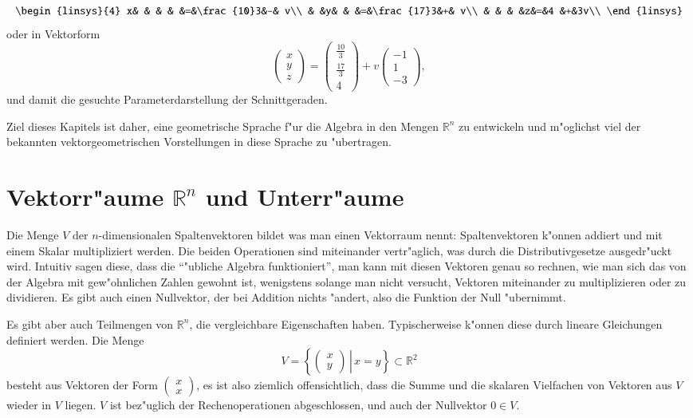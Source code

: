 \begin{equation}
\begin{linsys}{4}
x& & & & &=&\frac{10}3&-& v\\
 & &y& & &=&\frac{17}3&+& v\\
 & & & &z&=&4         &+&3v\\
\end{linsys}
\end{equation}
oder in Vektorform
\begin{equation}
\begin{pmatrix}x\\y\\z\end{pmatrix}
=\begin{pmatrix}\frac{10}3\\\frac{17}3\\4\end{pmatrix}
+v\begin{pmatrix}-1\\1\\-3\end{pmatrix},
\end{equation}
und damit die gesuchte Parameterdarstellung der Schnittgeraden.

Ziel dieses Kapitels ist daher, eine geometrische Sprache f"ur die
Algebra in den Mengen $\mathbb R^n$ zu entwickeln und m"oglichst viel
der bekannten vektorgeometrischen Vorstellungen in diese Sprache
zu "ubertragen.

\section{Vektorr"aume \texorpdfstring{$\mathbb R^n$}{R hoch n} und Unterr"aume}
Die Menge $V$ der $n$-dimensionalen Spaltenvektoren bildet was man
einen Vektorraum nennt: Spaltenvektoren k"onnen addiert und mit
einem Skalar multipliziert werden.
Die beiden Operationen sind
miteinander vertr"aglich, was durch die Distributivgesetze ausgedr"uckt
wird.
Intuitiv sagen diese, dass die ``"ubliche Algebra funktioniert'',
man kann mit diesen Vektoren genau so rechnen, wie man sich das von
der Algebra mit gew"ohnlichen Zahlen gewohnt ist, wenigstens solange
man nicht versucht, Vektoren miteinander zu multiplizieren oder zu
dividieren.
Es gibt auch einen Nullvektor, der bei Addition nichts "andert,
also die Funktion der Null "ubernimmt.

Es gibt aber auch Teilmengen von $\mathbb R^n$, die vergleichbare
Eigenschaften haben.
Typischerweise k"onnen diese durch lineare Gleichungen definiert werden.
Die Menge
\[
V=\left\{\left.\begin{pmatrix}x\\y\end{pmatrix}\,\right|\,x=y\right\}
\subset\mathbb R^2
\]
besteht aus Vektoren der Form $\begin{pmatrix}x\\x\end{pmatrix}$,
es ist also ziemlich offensichtlich, dass die Summe und die skalaren
Vielfachen von  Vektoren aus $V$ wieder in $V$ liegen.
$V$ ist
bez"uglich der Rechenoperationen abgeschlossen, und auch der Nullvektor
$0\in V$.

